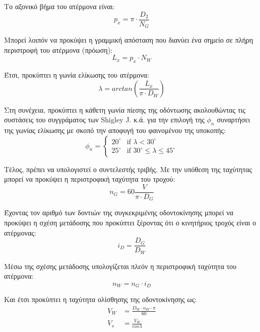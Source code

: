 Το αξονικό βήμα του ατέρμονα είναι:
\begin{equation}
p_x = \pi \cdot \frac{D_2}{N_G}
\end{equation}

Μπορεί λοιπόν να προκύψει η γραμμική απόσταση που διανύει ένα σημείο σε πλήρη περιστροφή του ατέρμονα (πρόωση):
\begin{equation}
L_x = p_x \cdot N_W
\end{equation}


Έτσι, προκύπτει η γωνία ελίκωσης του ατέρμονα:
\begin{equation}
\lambda = arctan(\frac{L_x}{\pi \cdot D_W})
\end{equation}

Στη συνέχεια, προκύπτει η κάθετη γωνία πίεσης της οδόντωσης ακολουθώντας τις συστάσεις του συγγράματος των Shigley J. κ.ά. \cite{handbook} για την επιλογή της $\phi_n$ συναρτήσει της γωνίας ελίκωσης με σκοπό την αποφυγή του φαινομένου της υποκοπής:
\begin{equation}
    \phi_n = \begin{cases} 
      20^{\circ} & \text{if } \lambda < 30^{\circ} \\
      25^{\circ} & \text{if } 30^{\circ} \leq \lambda \leq 45^{\circ}
    \end{cases}
\end{equation}

Τέλος, πρέπει να υπολογιστεί ο συντελεστής τριβής. Με την υπόθεση της ταχύτητας μπορεί να προκύψει η περιστροφική ταχύτητα του τροχού:
\begin{equation}
n_G = 60\frac{V}{\pi \cdot D_G}
\end{equation}

Έχοντας τον αριθμό των δοντιών της συγκεκριμένης οδοντοκίνησης μπορεί να προκύψει η σχέση μετάδοσης που προκύπτει ξέροντας ότι ο κινητήριος τροχός είναι ο ατέρμονας:
\begin{equation}
i _D = \frac{D_G}{D_W}
\end{equation}


Μέσω της σχέσης μετάδοσης υπολογίζεται πλεόν η περιστροφική ταχύτητα του ατέρμονα:
\begin{equation}
n_W = n_G \cdot i_D
\end{equation}

Και έτσι προκύπτει η ταχύτητα ολίσθησης της οδοντοκίνησης ως:
\begin{align}
V_W &= \frac{D_W \cdot n_W \cdot \pi }{60}\\

V_s &= \frac{V_W}{cos\lambda}
\end{align}

